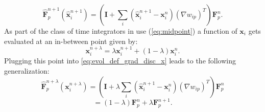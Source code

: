 \documentclass[m,times]{cgMA}
\begin{document}
\begin{equation}\label{eq:evol_def_grad_disc_x}
  \boldsymbol{\hat{F}}^{n+1}_p(\boldsymbol{\hat{x}}_i^{n+1}) =  \left( \boldsymbol{I} + \sum_i (\boldsymbol{\hat{x}}_i^{n+1} - \boldsymbol{x}_i^{n})({\nabla w_{ip}})^T \right)\boldsymbol{F}^{n}_p.
\end{equation}
As part of the class of time integrators in use (\ref{eq:midpoint}) a function of $\boldsymbol{x}_i$ gets evaluated at an in-between point given by:
\begin{equation}\label{eq:midpoint_x}
  \boldsymbol{x}_i^{n+\lambda} = \lambda \boldsymbol{x}_i^{n+1} + (1-\lambda)\boldsymbol{x}_i^n.
\end{equation}
Plugging this point into \ref{eq:evol_def_grad_disc_x} leads to the following generalization:
$$\boldsymbol{\hat{F}}^{n+\lambda}_p(\boldsymbol{x}_i^{n+\lambda}) = \left( \boldsymbol{I} + \lambda \sum_i (\boldsymbol{\hat{x}}_i^{n+1} - \boldsymbol{x}_i^{n})({\nabla w_{ip}})^T \right)\boldsymbol{F}^{n}_p
  $$
  \begin{equation} \label{eq:def_grad_lambda}
  = (1-\lambda)\boldsymbol{F}^n_p + \lambda \boldsymbol{F}^{n+1}_p.
\end{equation}
\begin{flushright}\cite{MPM:COURSE}\end{flushright}
\end{document}
